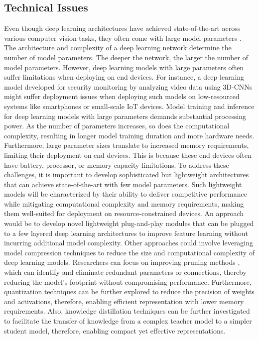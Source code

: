 \documentclass[preprint,12pt]{elsarticle}
\begin{document}
\subsection{Technical Issues}
Even though deep learning architectures have achieved state-of-the-art across various computer vision tasks, they often come with large model parameters \citep{raiaan_systematic_2024}. The architecture and complexity of a deep learning network determine the number of model parameters. The deeper the network, the larger the number of model parameters. However, deep learning models with large parameters often suffer limitations when deploying on end devices. For instance, a deep learning model developed for security monitoring by analyzing video data using 3D-CNNs might suffer deployment issues when deploying such models on low-resourced systems like smartphones or small-scale IoT devices. Model training and inference for deep learning models with large parameters demands substantial processing power. As the number of parameters increases, so does the computational complexity, resulting in longer model training duration and more hardware needs. Furthermore, large parameter sizes translate to increased memory requirements, limiting their deployment on end devices. This is because these end devices often have battery, processor, or memory capacity limitations. To address these challenges, it is important to develop sophisticated but lightweight architectures that can achieve state-of-the-art with few model parameters. Such lightweight models will be characterized by their ability to deliver competitive performance while mitigating computational complexity and memory requirements, making them well-suited for deployment on resource-constrained devices. An approach would be to develop novel lightweight plug-and-play modules that can be plugged to a few layered deep learning architectures to improve feature learning without incurring additional model complexity. Other approaches could involve leveraging model compression techniques to reduce the size and computational complexity of deep learning models. Researchers can focus on improving pruning methods \citep{pruning8794944}, which can identify and eliminate redundant parameters or connections, thereby reducing the model's footprint without compromising performance. Furthermore, quantization techniques \citep{Yang_CVPR} can be further explored to reduce the precision of weights and activations, therefore, enabling efficient representation with lower memory requirements. Also, knowledge distillation techniques \citep{NEURIPS2021_376c6b9f} can be further investigated to facilitate the transfer of knowledge from a complex teacher model to a simpler student model, therefore, enabling compact yet effective representations. 
\end{document}
